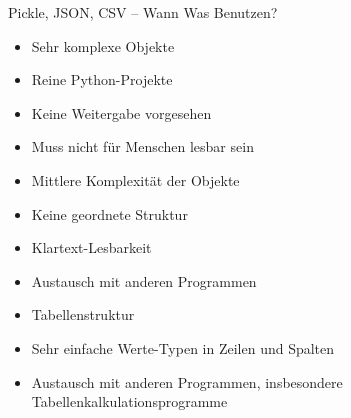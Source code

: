 
\begin{frame}[fragile]{Pickle, JSON, CSV -- Wann Was Benutzen?}
%
\begin{tcbraster}[raster columns=3,
                  raster equal height,
                  nobeforeafter,
                  raster column skip=0.5cm]
\begin{tcolorbox}[title=Pickle]
\begin{itemize}
\item Sehr komplexe Objekte
\item Reine Python-Projekte
\item Keine Weitergabe vorgesehen
\item Muss nicht für Menschen lesbar sein
\end{itemize}
\end{tcolorbox}
%
\begin{tcolorbox}[title=JSON]
\begin{itemize}
\item Mittlere Komplexität der Objekte
\item Keine geordnete Struktur
\item Klartext-Lesbarkeit
\item Austausch mit anderen Programmen
\end{itemize}
\end{tcolorbox}
%
\begin{tcolorbox}[title=CSV]
\begin{itemize}
\item Tabellenstruktur
\item Sehr einfache Werte-Typen in Zeilen und Spalten
\item Austausch mit anderen Programmen, insbesondere Tabellenkalkulationsprogramme
\end{itemize}
\end{tcolorbox}
\end{tcbraster}
%
\end{frame}